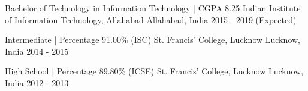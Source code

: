 

\begin{cventries}

  \cventry
    {Bachelor of Technology in Information Technology | CGPA 8.25} %
    {Indian Institute of Information Technology, Allahabad} %
    {Allahabad, India} %
    {2015 - 2019 (Expected)} %
    {
      \begin{cvitems} %
      \end{cvitems}
    }

  \cventry
    {Intermediate | Percentage 91.00\% (ISC)} %
    {St. Francis' College, Lucknow} %
    {Lucknow, India} %
    {2014 - 2015} %
    {
      \begin{cvitems} %
      \end{cvitems}
    }

  \cventry
    {High School | Percentage 89.80\% (ICSE)} %
    {St. Francis' College, Lucknow} %
    {Lucknow, India} %
    {2012 - 2013} %
    {
      \begin{cvitems} %
      \end{cvitems}
    }


\end{cventries}
